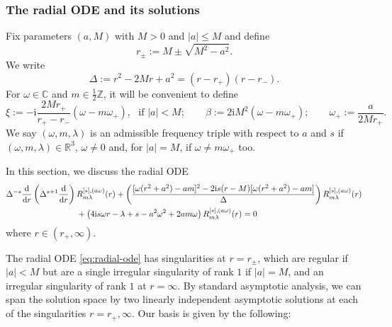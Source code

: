 \documentclass[11pt]{article}
\newcommand{\dd}{\mathrm{d}}
\newcommand{\ii}{\mathrm{i}}
\numberwithin{equation}{section}
\begin{document}
\subsubsection{The radial ODE and its solutions}
Fix parameters $(a,M)$ with $M>0$ and $|a|\leq M$ and define
\begin{equation}\label{eq:rpm}
        r_{\pm}:=M\pm \sqrt{M^2-a^2}.
\end{equation}
We write
\begin{equation}\label{eq:Delta}
        \Delta:=r^2-2Mr+a^2=(r-r_+)(r-r_-).
\end{equation}
For $\omega\in \mathbb C$ and $m\in \frac12\mathbb Z$, it will be convenient to define
\begin{equation}\label{eq:xi-beta}
        \xi:=-\ii\frac{2Mr_+}{r_+-r_-}(\omega-m\omega_+), \text{~~if $|a|<M$};\qquad
        \beta:=2\ii M^2(\omega-m\omega_+);\qquad
        \omega_+:=\frac{a}{2Mr_+}.
\end{equation}
We say  $(\omega,m,\lambda)$ is an admissible frequency triple with respect to $a$ and $s$ if $(\omega,m,\lambda)\in \mathbb R^3$,  $\omega\neq 0$ and, for $|a|=M$, if $\omega\neq m\omega_+$ too.

In this section, we discuss the radial ODE
\begin{align}
&\Delta^{-s}\frac{\dd}{\dd r}\left(\Delta^{s+1}\frac{\dd}{\dd r}\right)
        R^{[s],(a\omega)}_{m\lambda}(r)
 +\left(\frac{[\omega(r^2+a^2)-am]^2-2\ii s(r-M)[\omega(r^2+a^2)-am]}{\Delta}\right)
        R^{[s],(a\omega)}_{m\lambda}(r) \notag\\
&\hspace{30mm}
 +\left(4\ii s\omega r-\lambda+s-a^2\omega^2+2am\omega\right)
        R^{[s],(a\omega)}_{m\lambda}(r)
        =0
\label{eq:radial-ode}
\end{align}
where $r\in (r_+,\infty)$.

The radial ODE \eqref{eq:radial-ode} has singularities at $r=r_{\pm}$, which are regular if $|a|<M$ but are a single irregular singularity of rank $1$ if $|a|=M$, and an irregular singularity of rank $1$ at $r=\infty$. By standard asymptotic analysis, we can span the solution space by two linearly independent asymptotic solutions at each of the singularities $r=r_+,\infty$. Our basis is given by the following:
\end{document}
